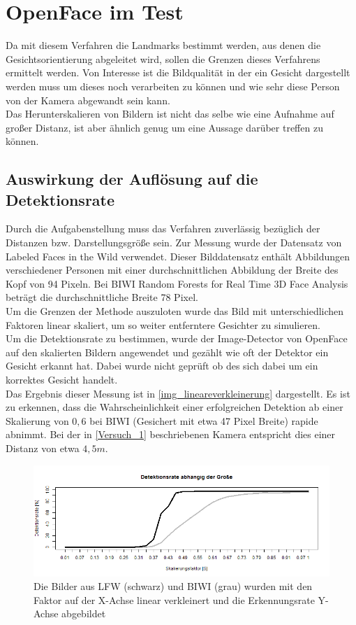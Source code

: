 \section{OpenFace im Test}
Da mit diesem Verfahren die Landmarks bestimmt werden, aus denen die Gesichtsorientierung abgeleitet wird, sollen die Grenzen dieses Verfahrens ermittelt werden. Von Interesse ist die Bildqualität in der ein Gesicht dargestellt werden muss um dieses noch verarbeiten zu können und wie sehr diese Person von der Kamera abgewandt sein kann.\\
Das Herunterskalieren von Bildern ist nicht das selbe wie eine Aufnahme auf großer Distanz, ist aber ähnlich genug um eine Aussage darüber treffen zu können.
\subsection{Auswirkung der Auflösung auf die Detektionsrate}
Durch die Aufgabenstellung muss das Verfahren zuverlässig bezüglich der Distanzen bzw. Darstellungsgröße sein. Zur Messung wurde der Datensatz von Labeled Faces in the Wild \cite{database_Face} verwendet. Dieser Bilddatensatz enthält Abbildungen verschiedener Personen mit einer durchschnittlichen Abbildung der Breite des Kopf von 94 Pixeln. Bei BIWI Random Forests for Real Time 3D Face Analysis \cite{database_Face_Ori} beträgt die durchschnittliche Breite 78 Pixel.\\
Um die Grenzen der Methode auszuloten wurde das Bild mit unterschiedlichen Faktoren linear skaliert, um so weiter entferntere Gesichter zu simulieren.\\
Um die Detektionsrate zu bestimmen, wurde der Image-Detector von OpenFace auf den skalierten Bildern angewendet und gezählt wie oft der Detektor ein Gesicht erkannt hat. Dabei wurde nicht geprüft ob des sich dabei um ein korrektes Gesicht handelt.\\
Das Ergebnis dieser Messung ist in \autoref{img_lineareverkleinerung} dargestellt. Es ist zu erkennen, dass die Wahrscheinlichkeit einer erfolgreichen Detektion ab einer Skalierung von $0,6$ bei BIWI (Gesichert mit etwa 47 Pixel Breite) rapide abnimmt. Bei der in \autoref{Versuch_1} beschriebenen Kamera entspricht dies einer Distanz von etwa $4,5m$.\\
\begin{figure}
	\centering
	\includegraphics[width=\linewidth]{img_Skalierung/Gesicht_Rate}
	\caption{Die Bilder aus LFW \cite{database_Face} (schwarz) und BIWI \cite{database_Face_Ori} (grau) wurden mit den Faktor auf der X-Achse linear verkleinert und die Erkennungsrate Y-Achse abgebildet}
	\label{img_lineareverkleinerung}
\end{figure}
